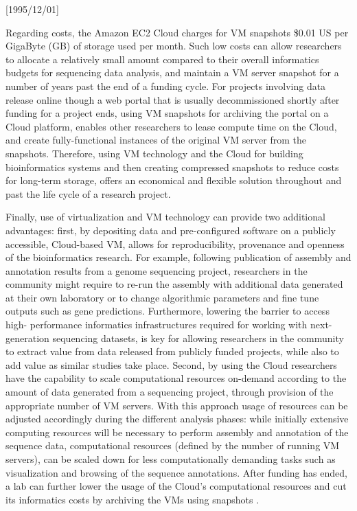 \NeedsTeXFormat{LaTeX2e}[1995/12/01] \documentclass[10pt]{bmc_article}
\newenvironment{bmcformat}{\begin{raggedright}\baselineskip20pt\sloppy\setboolean{publ}{false}}{\end{raggedright}\baselineskip20pt\sloppy}
\begin{document}
\begin{bmcformat}
Regarding costs, the Amazon EC2 Cloud \cite{awsec2} charges for VM snapshots \$0.01 US  per GigaByte (GB) 
of storage used per month. Such low costs can allow researchers to allocate a relatively small amount compared 
to their overall informatics budgets for sequencing data analysis, and maintain a VM server snapshot for a number 
of years past the end of a funding cycle. For projects involving data release online though a web portal that is 
usually decommissioned shortly after funding for a project ends, using VM snapshots for archiving the portal on 
a Cloud platform, enables other researchers to lease compute time on the Cloud, and create fully-functional 
instances of the original VM server from the snapshots. Therefore, using VM technology and the Cloud for building 
bioinformatics systems and then creating compressed snapshots to reduce costs for long-term storage, offers 
an economical and flexible solution throughout and past the life cycle of a research project. \pb

Finally, use of virtualization and VM technology can provide two additional advantages: first, by
depositing data and pre-configured software on a publicly accessible, Cloud-based VM, allows for 
reproducibility, provenance and openness of the bioinformatics research. For example, following publication 
of assembly and annotation results from a genome sequencing project, researchers in the community 
might require to re-run the assembly with additional data generated at their own laboratory or to change algorithmic 
parameters and fine tune outputs such as gene predictions. Furthermore, lowering the barrier to access high-
performance informatics infrastructures required for working with next-generation sequencing datasets, is key 
for allowing researchers in the community to extract value from  data released from publicly funded projects, while 
also to  add value as similar studies take place. Second, by using the Cloud researchers have the capability to scale 
computational resources on-demand according to the amount of data generated from a sequencing project, 
through provision of the appropriate number of VM servers. With this approach usage of resources can be 
adjusted accordingly during the different analysis phases: while initially extensive computing resources will be 
necessary to perform assembly and annotation of the sequence data, computational resources (defined by
the number of running VM servers), can be scaled down for less computationally demanding tasks such as 
visualization and browsing of the sequence annotations. After funding has ended, a lab can further  lower the 
usage of the Cloud's computational resources and cut its informatics costs by archiving the VMs using snapshots 
\cite{Dudley2010}.  \pb



\end{bmcformat}
\end{document}
